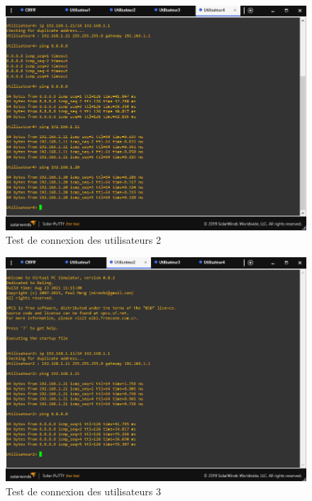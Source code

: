 \smallskip

\begin{figure}[H]
 \centering
    \includegraphics[width=16cm]{Images/BRades-Topologie8.png}
    \caption{Test de connexion des utilisateurs 2}
    \label{Chap2.2.8}
\end{figure}

\smallskip

\begin{figure}[H]
 \centering
    \includegraphics[width=16cm]{Images/BRades-Topologie9.png}
    \caption{Test de connexion des utilisateurs 3}
    \label{Chap2.2.9}
\end{figure}

\smallskip

